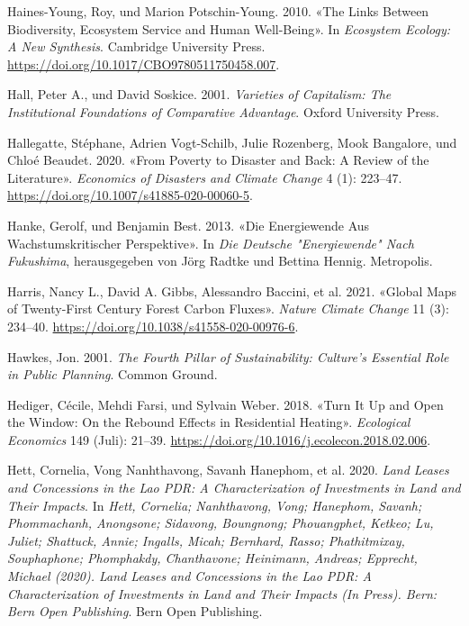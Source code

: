 \documentclass[
  nswissgerman,
  a4paper,
  DIV=11,
  numbers=noendperiod,
  oneside,
  openany]{scrreprt}
\newlength{\cslhangindent}
\newenvironment{CSLReferences}[2] %
 {\begin{list}{}{%
  \setlength{\itemindent}{0pt}
  \setlength{\leftmargin}{0pt}
  \setlength{\parsep}{0pt}
  \ifodd #1
   \setlength{\leftmargin}{\cslhangindent}
   \setlength{\itemindent}{-1\cslhangindent}
  \fi
  \setlength{\itemsep}{#2\baselineskip}}}
 {\end{list}}
\begin{document}
\begin{CSLReferences}{1}{1}
Haines-Young, Roy, und Marion Potschin-Young. 2010. {«The Links Between
Biodiversity, Ecosystem Service and Human Well-Being»}. In
\emph{Ecosystem {Ecology}: {A New Synthesis}}. Cambridge University
Press. \url{https://doi.org/10.1017/CBO9780511750458.007}.

Hall, Peter A., und David Soskice. 2001. \emph{Varieties of
{Capitalism}: {The Institutional Foundations} of {Comparative
Advantage}}. Oxford University Press.

Hallegatte, Stéphane, Adrien Vogt-Schilb, Julie Rozenberg, Mook
Bangalore, und Chloé Beaudet. 2020. {«From {Poverty} to {Disaster} and
{Back}: A {Review} of the {Literature}»}. \emph{Economics of Disasters
and Climate Change} 4 (1): 223--47.
\url{https://doi.org/10.1007/s41885-020-00060-5}.

Hanke, Gerolf, und Benjamin Best. 2013. {«Die {Energiewende} Aus
Wachstumskritischer {Perspektive}»}. In \emph{Die Deutsche
"{Energiewende}" Nach {Fukushima}}, herausgegeben von Jörg Radtke und
Bettina Hennig. Metropolis.

{Harris, Nancy L., David A. Gibbs, Alessandro Baccini, et al.} 2021.
{«Global Maps of Twenty-First Century Forest Carbon Fluxes»}.
\emph{Nature Climate Change} 11 (3): 234--40.
\url{https://doi.org/10.1038/s41558-020-00976-6}.

Hawkes, Jon. 2001. \emph{The {Fourth Pillar} of {Sustainability}:
{Culture}'s {Essential Role} in {Public Planning}}. Common Ground.

Hediger, Cécile, Mehdi Farsi, und Sylvain Weber. 2018. {«Turn {It Up}
and {Open} the {Window}: {On} the {Rebound Effects} in {Residential
Heating}»}. \emph{Ecological Economics} 149 (Juli): 21--39.
\url{https://doi.org/10.1016/j.ecolecon.2018.02.006}.

Hett, Cornelia, Vong Nanhthavong, Savanh Hanephom, et al. 2020.
\emph{Land {Leases} and {Concessions} in the {Lao PDR}: {A}
Characterization of Investments in Land and Their Impacts}. In
\emph{Hett, Cornelia; Nanhthavong, Vong; Hanephom, Savanh; Phommachanh,
Anongsone; Sidavong, Boungnong; Phouangphet, Ketkeo; Lu, Juliet;
Shattuck, Annie; Ingalls, Micah; Bernhard, Rasso; Phathitmixay,
Souphaphone; Phomphakdy, Chanthavone; Heinimann, Andreas; Epprecht,
Michael (2020). Land Leases and Concessions in the Lao PDR: A
Characterization of Investments in Land and Their Impacts (In Press).
Bern: Bern Open Publishing}. Bern Open Publishing.


\end{CSLReferences}
\end{document}
